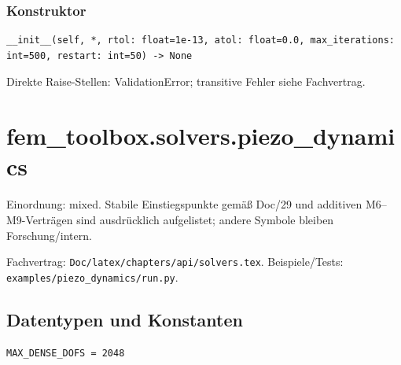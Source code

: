 \subsubsection*{Konstruktor}
\begin{lstlisting}
__init__(self, *, rtol: float=1e-13, atol: float=0.0, max_iterations: int=500, restart: int=50) -> None
\end{lstlisting}
Direkte Raise-Stellen: ValidationError; transitive Fehler siehe Fachvertrag.
\section{fem\_toolbox.solvers.piezo\_dynamics}
Einordnung: mixed. Stabile Einstiegspunkte gemäß Doc/29 und additiven M6–M9-Verträgen sind ausdrücklich aufgelistet; andere Symbole bleiben Forschung/intern.
\par Fachvertrag: \nolinkurl{Doc/latex/chapters/api/solvers.tex}. Beispiele/Tests:
\nolinkurl{examples/piezo_dynamics/run.py}.
\subsection*{Datentypen und Konstanten}
\begin{lstlisting}
MAX_DENSE_DOFS = 2048
\end{lstlisting}
